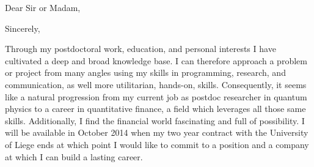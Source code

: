 \documentclass[12pt,a4paper,ariel]{moderncv}        %
\begin{document}
%
%
%
%
\recipient{\quad}{}
\date{\today}
\opening{Dear Sir or Madam,}
\closing{Sincerely,}
\makelettertitle
Through my postdoctoral work, education, and personal interests I have cultivated a deep and broad knowledge base. I can therefore approach a problem or project from many angles using my skills in programming, research, and communication, as well more utilitarian, hands-on, skills.  Consequently, it seems like a natural progression from my current job as postdoc researcher in quantum physics to a career in quantitative finance, a field which leverages all those same skills.  Additionally, I find the financial world fascinating and full of possibility.  I will be available in October 2014 when my two year contract with the University of Liege ends at which point I would like to commit to a position and a company at which I can build a lasting career.
 
\end{document}
